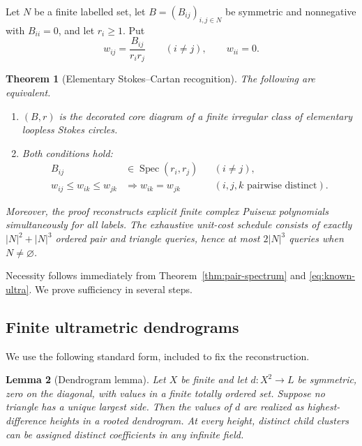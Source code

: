 \documentclass[11pt,a4paper]{amsart}
\theoremstyle{plain}
\newtheorem{theorem}{Theorem}[section]
\newtheorem{lemma}[theorem]{Lemma}
\theoremstyle{definition}
\newcommand{\Spec}{\operatorname{Spec}}
\begin{document}
Let $N$ be a finite labelled set, let $B=(B_{ij})_{i,j\in N}$ be symmetric and nonnegative with
$B_{ii}=0$, and let $r_i\ge1$.  Put
\begin{equation}\label{eq:weights-recognition}
 w_{ij}=\frac{B_{ij}}{r_ir_j}\qquad(i\ne j),
 \qquad w_{ii}=0.
\end{equation}

\begin{theorem}[Elementary Stokes--Cartan recognition]\label{thm:recognition}
The following are equivalent.
\begin{enumerate}[label=(\roman*)]
\item $(B,r)$ is the decorated core diagram of a finite irregular class of elementary loopless
Stokes circles.
\item Both conditions hold:
\begin{align}
 B_{ij}&\in\Spec(r_i,r_j) &&(i\ne j),\label{eq:pair-test}\\
 w_{ij}\le w_{ik}\le w_{jk}&\Longrightarrow w_{ik}=w_{jk}
 &&(i,j,k\text{ pairwise distinct}).\label{eq:ultra-test}
\end{align}
\end{enumerate}
Moreover, the proof reconstructs explicit finite complex Puiseux polynomials simultaneously for
all labels.  The exhaustive unit-cost schedule consists of exactly $|N|^2+|N|^3$ ordered pair and
triangle queries, hence at most $2|N|^3$ queries when $N\ne\varnothing$.
\end{theorem}

Necessity follows immediately from Theorem~\ref{thm:pair-spectrum} and
\eqref{eq:known-ultra}.  We prove sufficiency in several steps.

\subsection{Finite ultrametric dendrograms}

We use the following standard form, included to fix the reconstruction.

\begin{lemma}[Dendrogram lemma]\label{lem:dendrogram}
Let $X$ be finite and let $d:X^2\to L$ be symmetric, zero on the diagonal, with values in a finite
totally ordered set.  Suppose no triangle has a unique largest side.  Then the values of $d$ are
realized as highest-difference heights in a rooted dendrogram.  At every height, distinct child
clusters can be assigned distinct coefficients in any infinite field.
\end{lemma}
\end{document}
